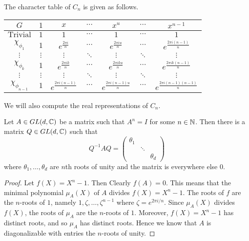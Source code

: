 \documentclass[a4paper]{article}
\begin{document}
\begin{thm}{}{} The character table of $C_n$ is given as follows. 
\begin{center}
\begin{tabular}{ c|cccccc } 
$G$ & $1$ & $x$ & $\cdots$ & $x^u$ & $\cdots$ & $x^{n-1}$ \\\hline
$\text{Trivial}$ & $1$ & $1$ & $\cdots$ & $1$ & $\cdots$ & $1$ \\
$\chi_{\phi_1}$ & $1$ & $e^{\frac{2\pi i}{n}}$ & $\cdots$ & $e^{\frac{2\pi iu}{n}}$ & $\cdots$ & $e^{\frac{2\pi i(n-1)}{n}}$ \\
$\vdots$ & $\vdots$ & $\vdots$ & $\ddots$ & $\vdots$ & $\ddots$ & $\vdots$ \\
$\chi_{\phi_k}$ & $1$ & $e^{\frac{2\pi ik}{n}}$ & $\cdots$ & $e^{\frac{2\pi iku}{n}}$ & $\cdots$ & $e^{\frac{2\pi ik(n-1)}{n}}$ \\
$\vdots$ & $\vdots$ & $\vdots$ & $\ddots$ & $\vdots$ & $\ddots$ & $\vdots$ \\
$\chi_{\phi_{n-1}}$ & $1$ & $e^{\frac{2\pi i(n-1)}{n}}$ & $\cdots$ & $e^{\frac{2\pi i(n-1)u}{n}}$ & $\cdots$ & $e^{\frac{2\pi i(n-1)(n-1)}{n}}$ \\
\end{tabular}
\end{center}
\end{thm}

We will also compute the real representations of $C_n$. 

\begin{lmm}{}{} Let $A\in GL(d,\mathbb{C})$ be a matrix such that $A^n=I$ for some $n\in\mathbb{N}$. Then there is a matrix $Q\in GL(d,\mathbb{C})$ such that $$Q^{-1}AQ=\begin{pmatrix}
\theta_1 & & \\
& \ddots &\\
& & \theta_d
\end{pmatrix}$$ where $\theta_1,\dots,\theta_d$ are $n$th roots of unity and the matrix is everywhere else $0$. \tcbline
\begin{proof}
Let $f(X)=X^n-1$. Then Clearly $f(A)=0$. This means that the minimal polynomial $\mu_A(X)$ of $A$ divides $f(X)=X^n-1$. The roots of $f$ are the $n$-roots of $1$, namely $1,\zeta,\dots,\zeta^{n-1}$ where $\zeta=e^{2\pi i/n}$. Since $\mu_A(X)$ divides $f(X)$, the roots of $\mu_A$ are the $n$-roots of $1$. Moreover, $f(X)=X^n-1$ has distinct roots, and so $\mu_A$ has distinct roots. Hence we know that $A$ is diagonalizable with entries the $n$-roots of unity. 
\end{proof}
\end{lmm}
\end{document}
